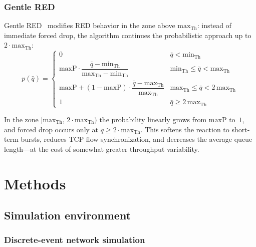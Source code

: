 \documentclass[default]{subfiles}
\begin{document}
{\subsubsection{Gentle RED}

Gentle RED~\cite{floyd2000} modifies RED behavior in the zone above $\mathrm{max}_{\mathrm{Th}}$: instead of immediate forced drop, the algorithm continues the probabilistic approach up to $2 \cdot \mathrm{max}_{\mathrm{Th}}$:
\begin{equation}
p(\bar{q}) = \begin{cases}
0 & \bar{q} < \mathrm{min}_{\mathrm{Th}} \\[4pt]
\mathrm{maxP} \cdot \dfrac{\bar{q} - \mathrm{min}_{\mathrm{Th}}}{\mathrm{max}_{\mathrm{Th}} - \mathrm{min}_{\mathrm{Th}}}
  & \mathrm{min}_{\mathrm{Th}} \le \bar{q} < \mathrm{max}_{\mathrm{Th}} \\[8pt]
\mathrm{maxP} + (1 - \mathrm{maxP}) \cdot \dfrac{\bar{q} - \mathrm{max}_{\mathrm{Th}}}{\mathrm{max}_{\mathrm{Th}}}
  & \mathrm{max}_{\mathrm{Th}} \le \bar{q} < 2\,\mathrm{max}_{\mathrm{Th}} \\[4pt]
1 & \bar{q} \ge 2\,\mathrm{max}_{\mathrm{Th}}
\end{cases}
\end{equation}

In the zone $[\mathrm{max}_{\mathrm{Th}},\, 2\cdot\mathrm{max}_{\mathrm{Th}})$ the probability linearly grows from $\mathrm{maxP}$ to~$1$, and forced drop occurs only at $\bar{q} \ge 2\cdot\mathrm{max}_{\mathrm{Th}}$. This softens the reaction to short-term bursts, reduces TCP flow synchronization, and decreases the average queue length---at the cost of somewhat greater throughput variability.

\section{Methods}
\label{sec:methods}

\subsection{Simulation environment}

\subsubsection{Discrete-event network simulation}

}
\end{document}
